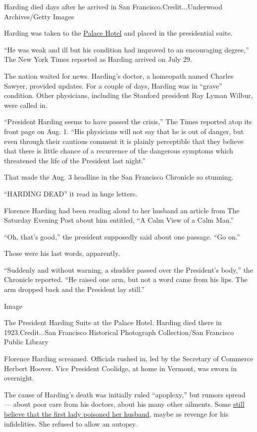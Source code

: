 Harding died days after he arrived in San Francisco.Credit...Underwood
Archives/Getty Images

Harding was taken to the
\href{https://www.marriott.com/hotels/travel/sfolc-palace-hotel-a-luxury-collection-hotel-san-francisco/}{Palace
Hotel} and placed in the presidential suite.

``He was weak and ill but his condition had improved to an encouraging
degree,'' The New York Times reported as Harding arrived on July 29.

The nation waited for news. Harding's doctor, a homeopath named Charles
Sawyer, provided updates. For a couple of days, Harding was in ``grave''
condition. Other physicians, including the Stanford president Ray Lyman
Wilbur, were called in.

``President Harding seems to have passed the crisis,'' The Times
reported atop its front page on Aug. 1. ``His physicians will not say
that he is out of danger, but even through their cautious comment it is
plainly perceptible that they believe that there is little chance of a
recurrence of the dangerous symptoms which threatened the life of the
President last night.''

That made the Aug. 3 headline in the San Francisco Chronicle so
stunning.

``HARDING DEAD'' it read in huge letters.

Florence Harding had been reading aloud to her husband an article from
The Saturday Evening Post about him entitled, ``A Calm View of a Calm
Man.''

``Oh, that's good,'' the president supposedly said about one passage.
``Go on.''

Those were his last words, apparently.

``Suddenly and without warning, a shudder passed over the President's
body,'' the Chronicle reported. ``He raised one arm, but not a word came
from his lips. The arm dropped back and the President lay still.''

Image

The President Harding Suite at the Palace Hotel. Harding died there in
1923.Credit...San Francisco Historical Photograph Collection/San
Francisco Public Library

Florence Harding screamed. Officials rushed in, led by the Secretary of
Commerce Herbert Hoover. Vice President Coolidge, at home in Vermont,
was sworn in overnight.

The cause of Harding's death was initially ruled ``apoplexy,'' but
rumors spread --- about poor care from his doctors, about his many other
ailments. Some
\href{https://www.mercurynews.com/2018/09/04/bay-area-history-on-95th-anniversary-of-president-warren-g-hardings-death-san-francisco-man-renews-story-of-poisoning/}{still
believe that the first lady poisoned her husband}, maybe as revenge for
his infidelities. She refused to allow an autopsy.

